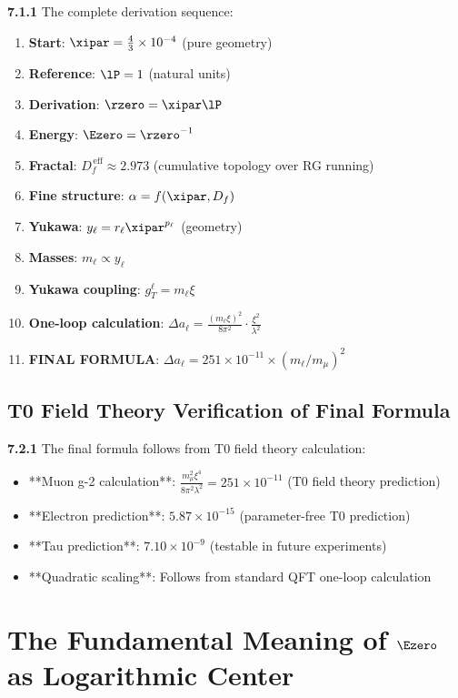 	\noindent \textbf{7.1.1} The complete derivation sequence:
	\begin{enumerate}
		\item \textbf{Start}: $\xipar = \frac{4}{3} \times 10^{-4}$ (pure geometry)
		\item \textbf{Reference}: $\lP = 1$ (natural units)
		\item \textbf{Derivation}: $\rzero = \xipar \lP$
		\item \textbf{Energy}: $\Ezero = \rzero^{-1}$
		\item \textbf{Fractal}: $D_f^{\,\text{eff}} \approx 2.973$ (cumulative topology over RG running)
		\item \textbf{Fine structure}: $\alpha = f(\xipar, D_f)$
		\item \textbf{Yukawa}: $y_\ell = r_\ell \xipar^{p_\ell}$ (geometry)
		\item \textbf{Masses}: $m_\ell \propto y_\ell$
		\item \textbf{Yukawa coupling}: $g_T^\ell = m_\ell \xi$
		\item \textbf{One-loop calculation}: $\Delta a_\ell = \frac{(m_\ell \xi)^2}{8\pi^2} \cdot \frac{\xi^2}{\lambda^2}$
		\item \textbf{FINAL FORMULA}: $\Delta a_\ell = 251 \times 10^{-11} \times (m_\ell/m_\mu)^2$
	\end{enumerate}
	
	\subsection{T0 Field Theory Verification of Final Formula}
	
	\noindent \textbf{7.2.1} The final formula follows from T0 field theory calculation:
	\begin{itemize}
		\item **Muon g-2 calculation**: $\frac{m_\mu^2 \xi^4}{8\pi^2 \lambda^2} = 251 \times 10^{-11}$ (T0 field theory prediction)
		\item **Electron prediction**: $5.87 \times 10^{-15}$ (parameter-free T0 prediction)
		\item **Tau prediction**: $7.10 \times 10^{-9}$ (testable in future experiments)
		\item **Quadratic scaling**: Follows from standard QFT one-loop calculation
	\end{itemize}
	
\section{The Fundamental Meaning of $\Ezero$ as Logarithmic Center}

